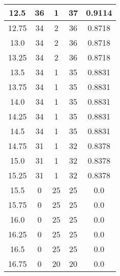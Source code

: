 \documentclass[letterpaper, 12pt]{article}
\begin{document}
\begin{longtable}{|c|c|c|c|c|}
12.5 & 36 & 1 & 37 & 0.9114 \\
\hline
12.75 & 34 & 2 & 36 & 0.8718 \\
\hline
13.0 & 34 & 2 & 36 & 0.8718 \\
\hline
13.25 & 34 & 2 & 36 & 0.8718 \\
\hline
13.5 & 34 & 1 & 35 & 0.8831 \\
\hline
13.75 & 34 & 1 & 35 & 0.8831 \\
\hline
14.0 & 34 & 1 & 35 & 0.8831 \\
\hline
14.25 & 34 & 1 & 35 & 0.8831 \\
\hline
14.5 & 34 & 1 & 35 & 0.8831 \\
\hline
14.75 & 31 & 1 & 32 & 0.8378 \\
\hline
15.0 & 31 & 1 & 32 & 0.8378 \\
\hline
15.25 & 31 & 1 & 32 & 0.8378 \\
\hline
15.5 & 0 & 25 & 25 & 0.0 \\
\hline
15.75 & 0 & 25 & 25 & 0.0 \\
\hline
16.0 & 0 & 25 & 25 & 0.0 \\
\hline
16.25 & 0 & 25 & 25 & 0.0 \\
\hline
16.5 & 0 & 25 & 25 & 0.0 \\
\hline
16.75 & 0 & 20 & 20 & 0.0 \\
\hline
\end{longtable}
\end{document}
